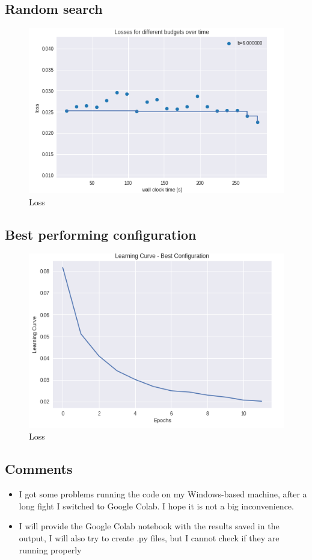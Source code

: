 \documentclass{scrartcl}
\begin{document}
\subsection*{Random search}

\begin{figure}[H]
	\centering
	\includegraphics[scale=0.6]{4}
	\caption{Loss}
	\label{fig:4}
\end{figure}

\subsection*{Best performing configuration}

\begin{figure}[H]
	\centering
	\includegraphics[scale=0.6]{5}
	\caption{Loss}
	\label{fig:5}
\end{figure}


\subsection*{Comments}

\begin{itemize}
	\item I got some problems running the code on my Windows-based machine, after a long fight I switched to Google Colab. I hope it is not a big inconvenience.
	\item I will provide the Google Colab notebook with the results saved in the output, I will also try to create .py files, but I cannot check if they are running properly
\end{itemize}
\end{document}
